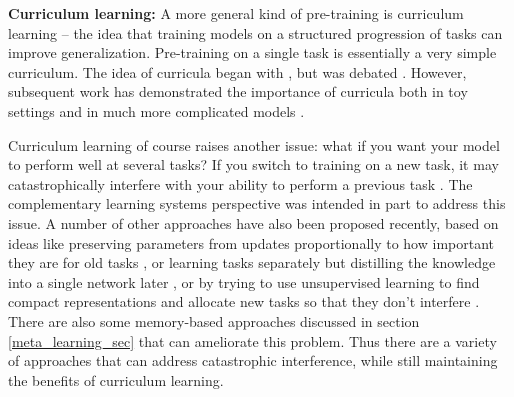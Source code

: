 \textbf{Curriculum learning:} A more general kind of pre-training is curriculum learning \citep{Bengio2009} -- the idea that training models on a structured progression of tasks can improve generalization. Pre-training on a single task is essentially a very simple curriculum. The idea of curricula began with \citet{Elman1993}, but was debated \citep[e.g.][]{Rohde1997}. However, subsequent work has demonstrated the importance of curricula both in toy settings \citep{Gulcehre2013} and in much more complicated models \citep[for example][discussed below]{Graves2016}. \par
Curriculum learning of course raises another issue: what if you want your model to perform well at several tasks? If you switch to training on a new task, it may catastrophically interfere with your ability to perform a previous task \citep{McCloskey1989}. The complementary learning systems perspective \citep{McClelland1995, Kumaran2016} was intended in part to address this issue. A number of other approaches have also been proposed recently, based on ideas like preserving parameters from updates proportionally to how important they are for old tasks \citep{Kirkpatrick2016}, or learning tasks separately but distilling the knowledge into a single network later \citep{Rusu2015}, or by trying to use unsupervised learning to find compact representations and allocate new tasks so that they don't interfere \citep{Achille2018a}. There are also some memory-based approaches discussed in section \ref{meta_learning_sec} that can ameliorate this problem. Thus there are a variety of approaches that can address catastrophic interference, while still maintaining the benefits of curriculum learning. \par

